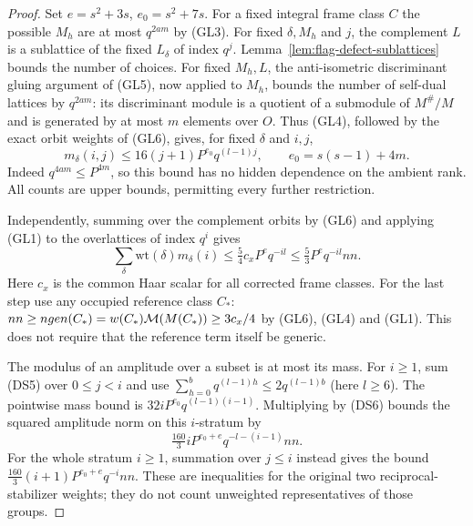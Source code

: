 \begin{proof}
Set \(e=s^2+3s\), \(e_0=s^2+7s\).
For a fixed integral frame class \(C\) the possible
\(M_h\) are at most \(q^{2am}\) by (GL3).
For fixed \(\delta,M_h\) and \(j\), the complement
\(L\) is a sublattice of the fixed \(L_\delta\)
of index \(q^j\). Lemma~\ref{lem:flag-defect-sublattices}
bounds the number of choices. For fixed \(M_h,L\),
the anti-isometric discriminant gluing argument of
(GL5), now applied to \(M_h\), bounds the number of
self-dual lattices by \(q^{2am}\): its discriminant
module is a quotient of a submodule of \(M^\#/M\)
and is generated by at most \(m\) elements over \(O\).
Thus (GL4), followed by the exact orbit weights
of (GL6), gives, for fixed \(\delta\) and \(i,j\),
\[
 m_\delta(i,j)\le
 16(j+1)P^{e_0}q^{(l-1)j},
 \qquad e_0=s(s-1)+4m.
 \tag{DS5}
\]
Indeed \(q^{4am}\le P^{4m}\), so this bound has no
hidden dependence on the ambient rank. All counts
are upper bounds, permitting every further restriction.

Independently, summing over the complement orbits by
(GL6) and applying (GL1) to the overlattices of index
\(q^i\) gives
\[
 \sum_\delta \mathrm{wt}(\delta)m_\delta(i)
       \le \tfrac54 c_x P^e q^{-il}
       \le \tfrac53 P^e q^{-il}nn.                  \tag{DS6}
\]
Here \(c_x\) is the common Haar scalar for all corrected
frame classes. For the last step use any occupied
reference class \(C_*\):
\(nn\ge ngen(C_*)=w(C_*){\cal M}(M(C_*))
\ge3c_x/4\) by (GL6), (GL4) and (GL1).
This does not require that the reference term itself
be generic.

The modulus of an amplitude over a subset is at most
its mass. For \(i\ge1\), sum (DS5) over \(0\le j<i\)
and use \(\sum_{h=0}^{b} q^{(l-1)h}\le
2q^{(l-1)b}\) (here \(l\ge6\)).
The pointwise mass bound is
\(32 i P^{e_0}q^{(l-1)(i-1)}\).
Multiplying by (DS6) bounds the squared amplitude norm
on this \(i\)-stratum by
\[
 \tfrac{160}{3} i P^{e_0+e}q^{-l-(i-1)}nn .
\]
For the whole stratum \(i\ge1\), summation over \(j\le i\)
instead gives the bound
\(\tfrac{160}{3}(i+1)P^{e_0+e}q^{-i}nn\).
These are inequalities for the original two
reciprocal-stabilizer weights; they do not count
unweighted representatives of those groups.


\end{proof}
